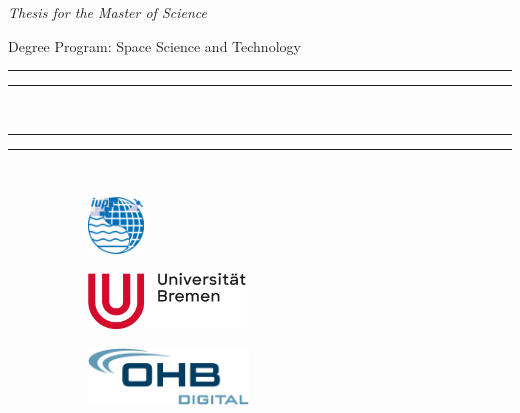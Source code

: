 \begin{titlingpage} %
\thispagestyle{empty} 
\begin{center}
\begin{large}
\vspace*{1.5cm}
  \textit{Thesis for the Master of Science}\\
\end{large}
\vspace{2cm}Degree Program: Space Science and Technology \\ 
\vspace{2cm} %
\medskip
\noindent
\rule{\textwidth}{1.6pt}\vspace*{-\baselineskip}\vspace{3.2pt} %
\rule{\textwidth}{0.4pt}\\%
\onehalfspacing%
{\noindent\LARGE\textbf{\thetitle}\par}
\noindent
\rule{\textwidth}{0.4pt}\vspace*{-\baselineskip}\vspace{3.2pt} %
\rule{\textwidth}{1.6pt}\\%
\vspace{3cm}
\theauthor%
\vspace{\fill} %
\begin{figure}[!b]
  \begin{subfigure}{0.15\textwidth}
    \includegraphics[height=1.5cm]{img/res/logoIUP.png}
  \end{subfigure}
  \begin{subfigure}{0.3\textwidth}
    \includegraphics[height=1.5cm]{img/res/logo.png}
  \end{subfigure}\hspace{0.20\textwidth} 
  \begin{subfigure}{0.35\textwidth}
    \centering
    \includegraphics[height=1.5cm]{img/res/logo_ohb_digital.png}
  \end{subfigure}
\end{figure}
\end{center}
\afterpage{\null\thispagestyle{empty}\newpage}
\end{titlingpage}
